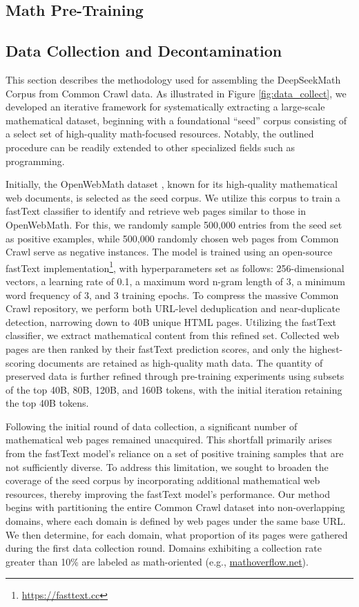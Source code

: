 \begin{itemize}[topsep=0pt]
\section{Math Pre-Training}

\subsection{Data Collection and Decontamination}
This section describes the methodology used for assembling the DeepSeekMath Corpus from Common Crawl data. As illustrated in Figure \ref{fig:data_collect}, we developed an iterative framework for systematically extracting a large-scale mathematical dataset, beginning with a foundational “seed” corpus consisting of a select set of high-quality math-focused resources. Notably, the outlined procedure can be readily extended to other specialized fields such as programming.

Initially, the OpenWebMath dataset \citep{openwebmath}, known for its high-quality mathematical web documents, is selected as the seed corpus. We utilize this corpus to train a fastText classifier \citep{joulin2016fasttext} to identify and retrieve web pages similar to those in OpenWebMath. For this, we randomly sample 500,000 entries from the seed set as positive examples, while 500,000 randomly chosen web pages from Common Crawl serve as negative instances. The model is trained using an open-source fastText implementation\footnote{\url{https://fasttext.cc}}, with hyperparameters set as follows: 256-dimensional vectors, a learning rate of 0.1, a maximum word n-gram length of 3, a minimum word frequency of 3, and 3 training epochs. To compress the massive Common Crawl repository, we perform both URL-level deduplication and near-duplicate detection, narrowing down to 40B unique HTML pages. Utilizing the fastText classifier, we extract mathematical content from this refined set. Collected web pages are then ranked by their fastText prediction scores, and only the highest-scoring documents are retained as high-quality math data. The quantity of preserved data is further refined through pre-training experiments using subsets of the top 40B, 80B, 120B, and 160B tokens, with the initial iteration retaining the top 40B tokens.

Following the initial round of data collection, a significant number of mathematical web pages remained unacquired. This shortfall primarily arises from the fastText model's reliance on a set of positive training samples that are not sufficiently diverse. To address this limitation, we sought to broaden the coverage of the seed corpus by incorporating additional mathematical web resources, thereby improving the fastText model's performance. Our method begins with partitioning the entire Common Crawl dataset into non-overlapping domains, where each domain is defined by web pages under the same base URL. We then determine, for each domain, what proportion of its pages were gathered during the first data collection round. Domains exhibiting a collection rate greater than 10\% are labeled as math-oriented (e.g., \url{mathoverflow.net}).


\end{itemize}
